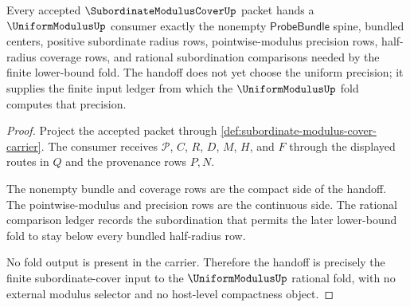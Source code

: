\begin{theorem}
\label{thm:subordinate-modulus-cover-uniform-handoff}
Every accepted $\SubordinateModulusCoverUp$ packet hands a $\UniformModulusUp$ consumer exactly the nonempty $\mathsf{ProbeBundle}$ spine, bundled centers, positive subordinate radius rows, pointwise-modulus precision rows, half-radius coverage rows, and rational subordination comparisons needed by the finite lower-bound fold. The handoff does not yet choose the uniform precision; it supplies the finite input ledger from which the $\UniformModulusUp$ fold computes that precision.
\end{theorem}
\begin{proof}
Project the accepted packet through \autoref{def:subordinate-modulus-cover-carrier}. The consumer receives $\mathcal{P}$, $C$, $R$, $D$, $M$, $H$, and $F$ through the displayed routes in $Q$ and the provenance rows $P,N$.

The nonempty bundle and coverage rows are the compact side of the handoff. The pointwise-modulus and precision rows are the continuous side. The rational comparison ledger records the subordination that permits the later lower-bound fold to stay below every bundled half-radius row.

No fold output is present in the carrier. Therefore the handoff is precisely the finite subordinate-cover input to the $\UniformModulusUp$ rational fold, with no external modulus selector and no host-level compactness object.
\end{proof}

